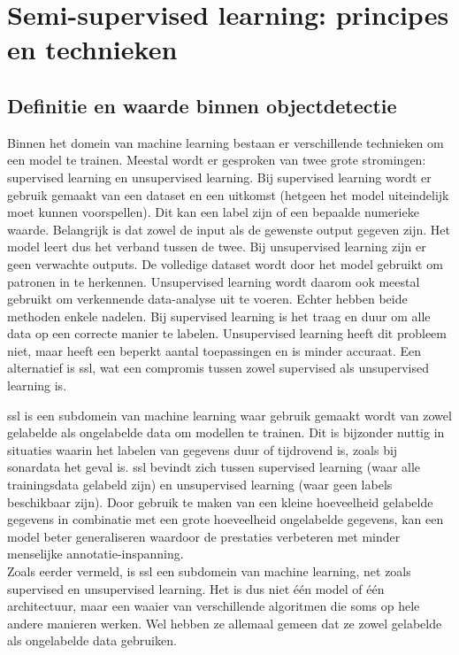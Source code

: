 \section{Semi-supervised learning: principes en technieken}

\subsection{Definitie en waarde binnen objectdetectie}

Binnen het domein van machine learning bestaan er verschillende technieken om een model te trainen. Meestal wordt er gesproken van twee grote stromingen: supervised learning en unsupervised learning. Bij supervised learning wordt er gebruik gemaakt van een dataset en een uitkomst (hetgeen het model uiteindelijk moet kunnen voorspellen). Dit kan een label zijn of een bepaalde numerieke waarde. Belangrijk is dat zowel de input als de gewenste output gegeven zijn. Het model leert dus het verband tussen de twee. Bij unsupervised learning zijn er geen verwachte outputs. De volledige dataset wordt door het model gebruikt om patronen in te herkennen. Unsupervised learning wordt daarom ook meestal gebruikt om verkennende data-analyse uit te voeren. Echter hebben beide methoden enkele nadelen. Bij supervised learning is het traag en duur om alle data op een correcte manier te labelen. Unsupervised learning heeft dit probleem niet, maar heeft een beperkt aantal toepassingen en is minder accuraat. Een alternatief is \gls{ssl}, wat een compromis tussen zowel supervised als unsupervised learning is. \autocite{C_A_Padmanabha_Reddy_2018}

\clearpage

\gls{ssl} is een subdomein van machine learning waar gebruik gemaakt wordt van zowel gelabelde als ongelabelde data om modellen te trainen. Dit is bijzonder nuttig in situaties waarin het labelen van gegevens duur of tijdrovend is, zoals bij sonardata het geval is. \gls{ssl} bevindt zich tussen supervised learning (waar alle trainingsdata gelabeld zijn) en unsupervised learning (waar geen labels beschikbaar zijn). Door gebruik te maken van een kleine hoeveelheid gelabelde gegevens in combinatie met een grote hoeveelheid ongelabelde gegevens, kan een model beter generaliseren waardoor de prestaties verbeteren met minder menselijke annotatie-inspanning. \autocite{Hady_2013} \\

Zoals eerder vermeld, is \gls{ssl} een subdomein van machine learning, net zoals supervised en unsupervised learning. Het is dus niet één model of één architectuur, maar een waaier van verschillende algoritmen die soms op hele andere manieren werken. Wel hebben ze allemaal gemeen dat ze zowel gelabelde als ongelabelde data gebruiken. \\

